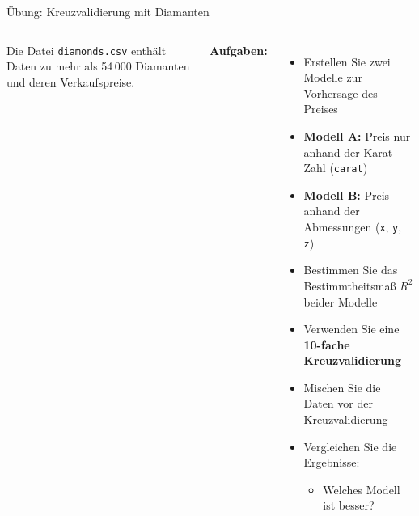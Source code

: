 \begin{frame}{Übung: Kreuzvalidierung mit Diamanten}
\begin{columns}

\footnotesize
Die Datei \texttt{diamonds.csv} enthält Daten zu mehr als 54\,000 Diamanten und deren Verkaufspreise.

\medskip

\textbf{Aufgaben:}
\begin{itemize}
\item Erstellen Sie zwei Modelle zur Vorhersage des Preises

\item \textbf{Modell A:} Preis nur anhand der Karat-Zahl (\texttt{carat})

\item \textbf{Modell B:} Preis anhand der Abmessungen (\texttt{x}, \texttt{y}, \texttt{z})

\item Bestimmen Sie das Bestimmtheitsmaß $R^2$ beider Modelle

\item Verwenden Sie eine \textbf{10-fache Kreuzvalidierung}

\item Mischen Sie die Daten vor der Kreuzvalidierung

\item Vergleichen Sie die Ergebnisse:
\begin{itemize}
    \item \footnotesize Welches Modell ist besser?
\end{itemize}
\end{itemize}



\end{columns}
\end{frame}

\makequizpage{\QUIZURL}{\QUIZQRCODE}{\QUIZIMAGE}




